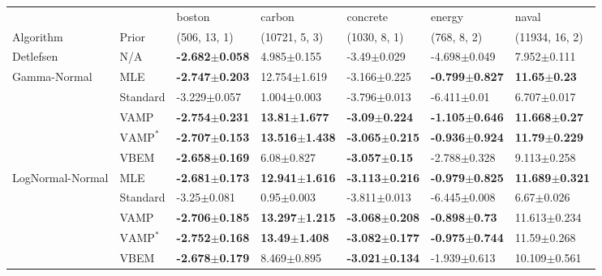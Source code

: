 \begin{tabular}{lllllll}
\toprule
                 &      &                     boston &                     carbon &                   concrete &                     energy &                      naval \\
Algorithm & Prior& (506, 13, 1)& (10721, 5, 3)& (1030, 8, 1)& (768, 8, 2)& (11934, 16, 2)\\
\midrule
Detlefsen & N/A &  \textbf{-2.682$\pm$0.058} &            4.985$\pm$0.155 &            -3.49$\pm$0.029 &           -4.698$\pm$0.049 &            7.952$\pm$0.111 \\
Gamma-Normal & MLE &  \textbf{-2.747$\pm$0.203} &           12.754$\pm$1.619 &           -3.166$\pm$0.225 &  \textbf{-0.799$\pm$0.827} &    \textbf{11.65$\pm$0.23} \\
                 & Standard &           -3.229$\pm$0.057 &            1.004$\pm$0.003 &           -3.796$\pm$0.013 &            -6.411$\pm$0.01 &            6.707$\pm$0.017 \\
                 & VAMP &  \textbf{-2.754$\pm$0.231} &   \textbf{13.81$\pm$1.677} &   \textbf{-3.09$\pm$0.224} &  \textbf{-1.105$\pm$0.646} &   \textbf{11.668$\pm$0.27} \\
                 & $\text{VAMP}^*$ &  \textbf{-2.707$\pm$0.153} &  \textbf{13.516$\pm$1.438} &  \textbf{-3.065$\pm$0.215} &  \textbf{-0.936$\pm$0.924} &   \textbf{11.79$\pm$0.229} \\
                 & VBEM &  \textbf{-2.658$\pm$0.169} &             6.08$\pm$0.827 &   \textbf{-3.057$\pm$0.15} &           -2.788$\pm$0.328 &            9.113$\pm$0.258 \\
LogNormal-Normal & MLE &  \textbf{-2.681$\pm$0.173} &  \textbf{12.941$\pm$1.616} &  \textbf{-3.113$\pm$0.216} &  \textbf{-0.979$\pm$0.825} &  \textbf{11.689$\pm$0.321} \\
                 & Standard &            -3.25$\pm$0.081 &             0.95$\pm$0.003 &           -3.811$\pm$0.013 &           -6.445$\pm$0.008 &             6.67$\pm$0.026 \\
                 & VAMP &  \textbf{-2.706$\pm$0.185} &  \textbf{13.297$\pm$1.215} &  \textbf{-3.068$\pm$0.208} &   \textbf{-0.898$\pm$0.73} &           11.613$\pm$0.234 \\
                 & $\text{VAMP}^*$ &  \textbf{-2.752$\pm$0.168} &   \textbf{13.49$\pm$1.408} &  \textbf{-3.082$\pm$0.177} &  \textbf{-0.975$\pm$0.744} &            11.59$\pm$0.268 \\
                 & VBEM &  \textbf{-2.678$\pm$0.179} &            8.469$\pm$0.895 &  \textbf{-3.021$\pm$0.134} &           -1.939$\pm$0.613 &           10.109$\pm$0.561 \\

\end{tabular}
